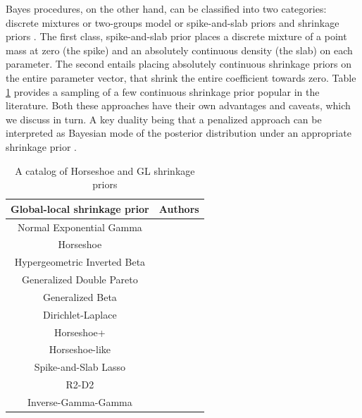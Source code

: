 \documentclass[sts,preprint]{imsart}
\begin{document}
Bayes procedures, on the other hand, can be classified into two categories: discrete mixtures or two-groups model or spike-and-slab priors \citep{johnstone2004needles,efron2010large,efron2008microarrays,bogdan2011asymptotic} and shrinkage priors \citep{bhadra2015horseshoe+,armagan2011generalized,armagan2013generalized,carvalho2009handling,carvalho2010horseshoe,griffin2005alternative,polson2010shrink,castillo2012needles}. {The first class, spike-and-slab prior places a discrete mixture of a point mass at zero (the spike) and an absolutely continuous density (the slab) on each parameter}. The second entails placing absolutely continuous shrinkage priors on the entire parameter vector, that shrink the entire coefficient towards zero. Table \ref{tab:one-gps} provides a sampling of a few continuous shrinkage prior popular in the literature. Both these approaches have their own advantages and caveats, which we discuss in turn.  A key duality being that a penalized approach can be interpreted as Bayesian mode of the posterior distribution under an appropriate shrinkage prior \citep{polson2015mixtures}. 


\begin{table}[htbp]
  \centering
  \caption{A catalog of Horseshoe and GL shrinkage priors}
  \footnotesize{
    \begin{tabular}{|c|c|}
    \hline
    Global-local shrinkage prior  & Authors  \bigstrut\\
    \hline
    Normal Exponential Gamma & \citet{griffin2005alternative} \bigstrut[t]\\
    Horseshoe & \citet{carvalho2010horseshoe, carvalho2009handling} \\
    Hypergeometric Inverted Beta & \citet{polson2010large} \\
    Generalized Double Pareto & \citet{armagan2011generalized} \\
    Generalized Beta  & \citet{armagan2013generalized} \\
    Dirichlet-Laplace & \citet{bhattacharya2014dirichlet} \\
    Horseshoe+  & \citet{bhadra2015horseshoe+} \\
    Horseshoe-like & \citet{bhadra2017horseshoe} \\
    Spike-and-Slab Lasso & \citet{rovckova2016spike} \\
    R2-D2 & \citet{zhang2016high} \bigstrut[b]\\
		Inverse-Gamma-Gamma & \citet{bai2017inverse} \bigstrut[b]\\
    \hline
    \end{tabular}%
    }
  \label{tab:one-gps}%
\end{table}%
\end{document}

